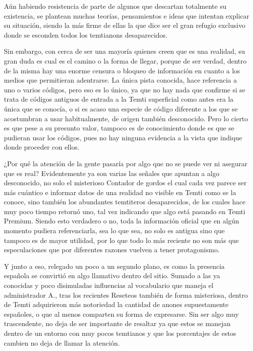 \documentclass[
  spanish,
]{book}
\begin{document}
Aún habiendo resistencia de parte de algunos que descartan totalmente su existencia, se plantean muchas teorías, pensamientos e ideas que intentan explicar su situación, siendo la más firme de ellas la que dice ser el gran refugio exclusivo donde se esconden todos los temtianons desaparecidos.

Sin embargo, con cerca de ser una mayoría quienes creen que es una realidad, su gran duda es cual es el camino o la forma de llegar, porque de ser verdad, dentro de la misma hay una enorme censura o bloqueo de información en cuanto a los medios que permitieran adentrarse. La única pista conocida, hace referencia a uno o varios códigos, pero eso es lo único, ya que no hay nada que confirme si se trata de códigos antiguos de entrada a la Temti superficial como antes era la única que se conocía, o si es acaso una especie de código diferente a los que se acostumbran a usar habitualmente, de origen también desconocido. Pero lo cierto es que pese a su presunto valor, tampoco es de conocimiento donde es que se pudieran usar los códigos, pues no hay ninguna evidencia a la vista que indique donde proceder con ellos.

¿Por qué la atención de la gente pasaría por algo que no se puede ver ni asegurar que es real? Evidentemente ya son varias las señales que apuntan a algo desconocido, no solo el misterioso Contador de gordos el cual cada vez parece ser más cuántico e informar datos de una realidad no visible en Temti como se la conoce, sino también los abundantes temtiteros desaparecidos, de los cuales hace muy poco tiempo retornó uno, tal vez indicando que algo está pasando en Temti Premium. Siendo esto verdadero o no, toda la información oficial que en algún momento pudiera referenciarla, sea lo que sea, no solo es antigua sino que tampoco es de mayor utilidad, por lo que todo lo más reciente no son más que especulaciones que por diferentes razones vuelven a tener protagonismo.

Y junto a eso, relegado un poco a un segundo plano, es como la presencia española se convirtió en algo llamativo dentro del sitio. Sumado a las ya conocidas y poco disimuladas influencias al vocabulario que maneja el administrador A., tras los recientes Reseteos también de forma misteriosa, dentro de Temti adquirieron más notoriedad la cantidad de anones supuestamente españoles, o que al menos comparten su forma de expresarse. Sin ser algo muy trascendente, no deja de ser importante de resaltar ya que estos se manejan dentro de un entorno con muy pocos temtianos y que los porcentajes de estos cambien no deja de llamar la atención.
\end{document}
